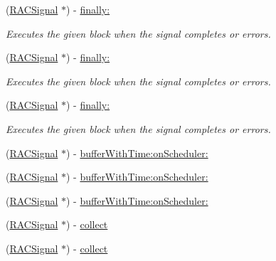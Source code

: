 \begin{DoxyCompactItemize}
(\mbox{\hyperlink{interface_r_a_c_signal}{R\+A\+C\+Signal}} $\ast$) -\/ \mbox{\hyperlink{interface_r_a_c_signal_ae07531acf550fb75812c77adfffc0bb7}{finally\+:}}
\begin{DoxyCompactList}\small\item\em Executes the given block when the signal completes or errors. \end{DoxyCompactList}\item 
\mbox{\label{interface_r_a_c_signal_ae07531acf550fb75812c77adfffc0bb7}} 
(\mbox{\hyperlink{interface_r_a_c_signal}{R\+A\+C\+Signal}} $\ast$) -\/ \mbox{\hyperlink{interface_r_a_c_signal_ae07531acf550fb75812c77adfffc0bb7}{finally\+:}}
\begin{DoxyCompactList}\small\item\em Executes the given block when the signal completes or errors. \end{DoxyCompactList}\item 
\mbox{\label{interface_r_a_c_signal_ae07531acf550fb75812c77adfffc0bb7}} 
(\mbox{\hyperlink{interface_r_a_c_signal}{R\+A\+C\+Signal}} $\ast$) -\/ \mbox{\hyperlink{interface_r_a_c_signal_ae07531acf550fb75812c77adfffc0bb7}{finally\+:}}
\begin{DoxyCompactList}\small\item\em Executes the given block when the signal completes or errors. \end{DoxyCompactList}\item 
(\mbox{\hyperlink{interface_r_a_c_signal}{R\+A\+C\+Signal}} $\ast$) -\/ \mbox{\hyperlink{interface_r_a_c_signal_a7f0cb2086a2123f40552d2eab2a9cc54}{buffer\+With\+Time\+:on\+Scheduler\+:}}
\item 
(\mbox{\hyperlink{interface_r_a_c_signal}{R\+A\+C\+Signal}} $\ast$) -\/ \mbox{\hyperlink{interface_r_a_c_signal_a7f0cb2086a2123f40552d2eab2a9cc54}{buffer\+With\+Time\+:on\+Scheduler\+:}}
\item 
(\mbox{\hyperlink{interface_r_a_c_signal}{R\+A\+C\+Signal}} $\ast$) -\/ \mbox{\hyperlink{interface_r_a_c_signal_a7f0cb2086a2123f40552d2eab2a9cc54}{buffer\+With\+Time\+:on\+Scheduler\+:}}
\item 
(\mbox{\hyperlink{interface_r_a_c_signal}{R\+A\+C\+Signal}} $\ast$) -\/ \mbox{\hyperlink{interface_r_a_c_signal_a70b8f976dc0ece9b82e47cdb346a3a09}{collect}}
\item 
(\mbox{\hyperlink{interface_r_a_c_signal}{R\+A\+C\+Signal}} $\ast$) -\/ \mbox{\hyperlink{interface_r_a_c_signal_a70b8f976dc0ece9b82e47cdb346a3a09}{collect}}

\end{DoxyCompactItemize}
